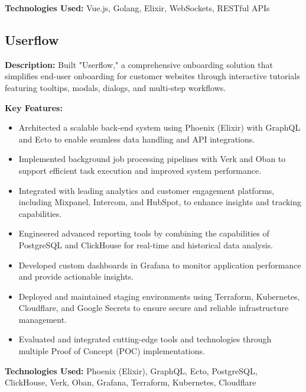 \documentclass{resume} %
\begin{document}
\textbf{Technologies Used:} Vue.js, Golang, Elixir, WebSockets, RESTful APIs

\subsection*{Userflow}

\textbf{Description:} Built "Userflow," a comprehensive onboarding solution that simplifies end-user onboarding for customer websites through interactive tutorials featuring tooltips, modals, dialogs, and multi-step workflows.

\textbf{Key Features:}
\begin{itemize}
    \item Architected a scalable back-end system using Phoenix (Elixir) with GraphQL and Ecto to enable seamless data handling and API integrations.
    \item Implemented background job processing pipelines with Verk and Oban to support efficient task execution and improved system performance.
    \item Integrated with leading analytics and customer engagement platforms, including Mixpanel, Intercom, and HubSpot, to enhance insights and tracking capabilities.
    \item Engineered advanced reporting tools by combining the capabilities of PostgreSQL and ClickHouse for real-time and historical data analysis.
    \item Developed custom dashboards in Grafana to monitor application performance and provide actionable insights.
    \item Deployed and maintained staging environments using Terraform, Kubernetes, Cloudflare, and Google Secrets to ensure secure and reliable infrastructure management.
    \item Evaluated and integrated cutting-edge tools and technologies through multiple Proof of Concept (POC) implementations.
\end{itemize}

\textbf{Technologies Used:} Phoenix (Elixir), GraphQL, Ecto, PostgreSQL, ClickHouse, Verk, Oban, Grafana, Terraform, Kubernetes, Cloudflare



\end{document}
